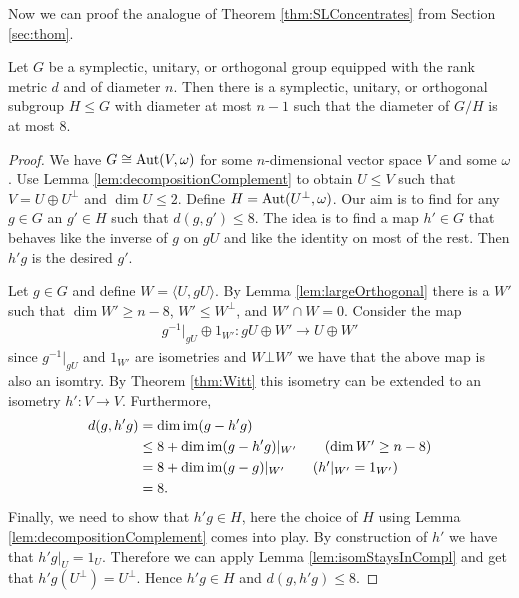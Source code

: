 Now we can proof the analogue of Theorem \ref{thm:SLConcentrates} from Section \ref{sec:thom}.
		
		
\begin{theorem}\label{thm:suoBoundDiam}
				
	Let $G$ be a symplectic, unitary, or orthogonal group equipped with the rank metric $d$ and of diameter $n$. Then there is a symplectic, unitary, or orthogonal subgroup $H\leq G$ with diameter at most $n-1$ such that the diameter of $G/H$ is at most $8$.
\end{theorem}
\begin{proof}
	We have $G\cong\operatorname{Aut}(V,\omega)$ for some $n$-dimensional vector space $V$ and some $\omega$. Use Lemma \ref{lem:decompositionComplement} to obtain $U\leq V$ such that $V=U\oplus U^\bot$ and $\dim U\leq2$. Define $H=\operatorname{Aut}(U^\bot,\omega)$. Our aim is to find for any $g\in G$ an $g'\in H$ such that $d(g,g')\leq8$.
	The idea is to find a map $h'\in G$ that behaves like the inverse of $g$ on $gU$ and like the identity on most of the rest. Then $h'g$ is the desired $g'$.
				
	Let $g\in G$ and define $W=\langle U,gU\rangle$. By Lemma \ref{lem:largeOrthogonal} there is a $W'$ such that $\dim W'\geq n-8$, $W'\leq W^\bot$, and $W'\cap W=0$. Consider the map
	\begin{align*}
		g^{-1}|_{gU}\oplus 1_{W'}\colon gU\oplus W'\to U\oplus W' 
	\end{align*}
	since $g^{-1}|_{gU}$ and $1_{W'}$ are isometries and $W\bot W'$ we have that the above map is also an isomtry. By Theorem \ref{thm:Witt} this isometry can be extended to an isometry $h'\colon V\to V$. Furthermore,
	\begin{align*}
		d(g,h'g) & =\dim\im (g-h'g)                                    \\
		         & \leq 8+\dim \im(g-h'g)|_{W'}\tag{$\dim W'\geq n-8$} \\
		         & = 8+\dim \im(g-g)|_{W'}\tag{$h'|_{W'}=1_{W'}$}      \\
		         & =8.                                                 
	\end{align*}
	Finally, we need to show that $h'g\in H$, here the choice of $H$ using Lemma \ref{lem:decompositionComplement} comes into play. By construction of $h'$ we have that $h'g|_U=1_U$. Therefore we can apply Lemma \ref{lem:isomStaysInCompl} and get that $h'g(U^\bot)= U^\bot$. Hence $h'g\in H$ and $d(g,h'g)\leq8$.
				
\end{proof}
		
